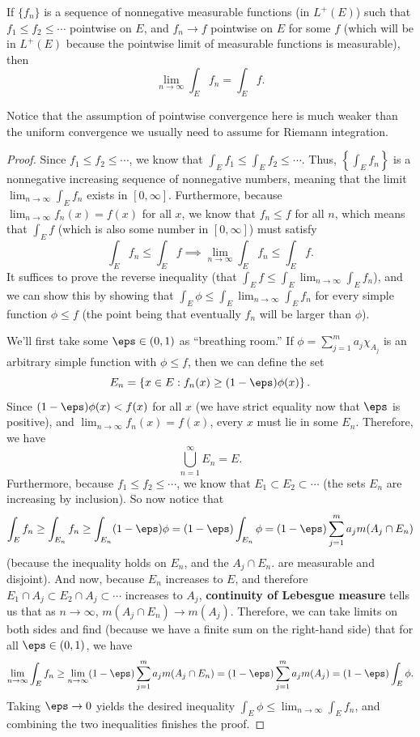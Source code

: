 \begin{theorem}\label{monotone}
If $\{f_n\}$ is a sequence of nonnegative measurable functions (in $L^+(E)$) such that $f_1 \le f_2 \le \cdots$ pointwise on $E$, and $f_n \to f$ pointwise on $E$ for some $f$ (which will be in $L^+(E)$ because the pointwise limit of measurable functions is measurable), then 
\[
    \lim_{n \to \infty} \int_E f_n = \int_E f.
\]
\end{theorem}

Notice that the assumption of pointwise convergence here is much weaker than the uniform convergence we usually need to assume for Riemann integration.

\begin{proof}
Since $f_1 \le f_2 \le \cdots$, we know that $\int_E f_1 \le \int_E f_2 \le \cdots$. Thus, $\left\{\int_E f_n\right\}$ is a nonnegative increasing sequence of nonnegative numbers, meaning that the limit $\lim_{n \to \infty} \int_E f_n$ exists in $[0, \infty]$. Furthermore, because $\lim_{n \to \infty} f_n(x) = f(x)$ for all $x$, we know that $f_n \le f$ for all $n$, which means that $\int_E f$ (which is also some number in $[0, \infty]$) must satisfy 
\[
    \int_E f_n \le \int_E f \implies \lim_{n \to \infty}\int_E f_n \le \int_E f.
\]
It suffices to prove the reverse inequality (that $\int_E f \le \int_E \lim_{n \to \infty}\int_E f_n$), and we can show this by showing that $\int_E \phi \le \int_E \lim_{n \to \infty}\int_E f_n$ for every simple function $\phi \le f$ (the point being that eventually $f_n$ will be larger than $\phi$). 

We'll first take some $\eps \in (0, 1)$ as ``breathing room.'' If $\phi = \sum_{j=1}^m a_j \chi_{A_j}$ is an arbitrary simple function with $\phi \le f$, then we can define the set
\[
    E_n = \left\{x \in E: f_n(x) \ge (1- \eps) \phi(x)\right\}.
\]
Since $(1 - \eps) \phi(x) < f(x)$ for all $x$ (we have strict equality now that $\eps$ is positive), and $\lim_{n \to \infty} f_n(x) = f(x)$, every $x$ must lie in some $E_n$. Therefore, we have
\[
    \bigcup_{n=1}^{\infty} E_n = E.
\]
Furthermore, because $f_1 \le f_2 \le \cdots$, we know that $E_1 \subset E_2 \subset \cdots$ (the sets $E_n$ are increasing by inclusion). So now notice that
\[
    \int_E f_n \ge \int_{E_n} f_n \ge \int_{E_n} (1 - \eps) \phi = (1-\eps) \int_{E_n} \phi = (1 - \eps) \sum_{j=1}^m a_j m(A_j \cap E_n)
\]
(because the inequality holds on $E_n$, and the $A_j \cap E_n$. are measurable and disjoint). And now, because $E_n$ increases to $E$, and therefore $E_1 \cap A_j \subset E_2 \cap A_j \subset \cdots$ increases to $A_j$, \textbf{continuity of Lebesgue measure} tells us that as $n \to \infty$, $m(A_j \cap E_n) \to m(A_j)$. Therefore, we can take limits on both sides and find (because we have a finite sum on the right-hand side) that for all $\eps \in (0, 1)$, we have
\[
    \lim_{n \to \infty} \int_E f_n \ge \lim_{n \to \infty} (1 - \eps) \sum_{j=1}^m a_j m(A_j \cap E_n) = (1 - \eps) \sum_{j=1}^m a_j m(A_j) = (1 - \eps) \int_E \phi.
\]
Taking $\eps \to 0$ yields the desired inequality $\int_E \phi \le \lim_{n \to \infty} \int_E f_n$, and combining the two inequalities finishes the proof.
\end{proof}

